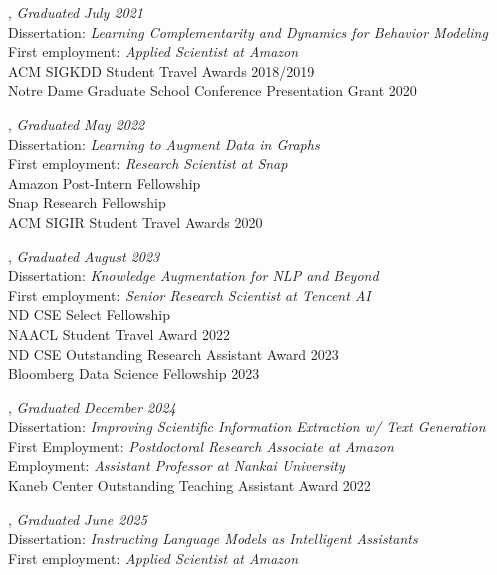 \documentclass[10pt]{article}
\newenvironment{myindentpar}[1]%
{\begin{list}{}%
         {\setlength{\leftmargin}{#1}}%
         \item[]%
}
{\end{list}}
\newcounter{list}
\begin{document}
\begin{myindentpar}{0.75cm}

\hspace{-0.75cm}{\bf Daheng Wang}, \textit{Graduated July 2021} \\
	{Dissertation: \textit{Learning Complementarity and Dynamics for Behavior Modeling}} \\
	{First employment: \textit{Applied Scientist at Amazon}} \\
	{ACM SIGKDD Student Travel Awards 2018/2019} \\
	{Notre Dame Graduate School Conference Presentation Grant 2020}

\hspace{-0.75cm}{\bf Tong Zhao}, \textit{Graduated May 2022} \\
	{Dissertation: \textit{Learning to Augment Data in Graphs}} \\
	{First employment: \textit{Research Scientist at Snap}} \\	
	{Amazon Post-Intern Fellowship} \\
	{Snap Research Fellowship} \\	
	{ACM SIGIR Student Travel Awards 2020}

\hspace{-0.75cm}{\bf Wenhao Yu}, \textit{Graduated August 2023} \\
	{Dissertation: \textit{Knowledge Augmentation for NLP and Beyond}} \\
	{First employment: \textit{Senior Research Scientist at Tencent AI}} \\	
	{ND CSE Select Fellowship} \\
	{NAACL Student Travel Award 2022} \\
	{ND CSE Outstanding Research Assistant Award 2023} \\
	{Bloomberg Data Science Fellowship 2023}

\hspace{-0.75cm}{\bf Qingkai Zeng}, \textit{Graduated December 2024} \\
	{Dissertation: \textit{Improving Scientific Information Extraction w/ Text Generation}} \\
	{First Employment: \textit{Postdoctoral Research Associate at Amazon}} \\
	{Employment: \textit{Assistant Professor at Nankai University}} \\	
	{Kaneb Center Outstanding Teaching Assistant Award 2022}

\hspace{-0.75cm}{\bf Zhihan Zhang}, \textit{Graduated June 2025} \\
	{Dissertation: \textit{Instructing Language Models as Intelligent Assistants}} \\
	{First employment: \textit{Applied Scientist at Amazon}}


\end{myindentpar}
\end{document}
